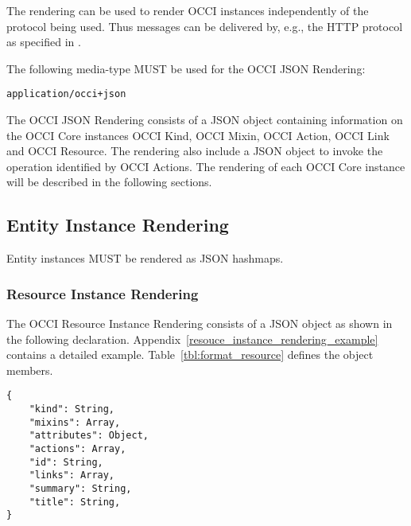 \documentclass[10pt,a4paper]{article}
\begin{document}
The rendering can be used to render OCCI instances independently of the
protocol being used. Thus messages can be delivered by, e.g., the HTTP
protocol as specified in \cite{occi:protocol}.

The following media-type MUST be used for the OCCI JSON Rendering:

{\tt application/occi+json}

The OCCI JSON Rendering consists of a JSON object containing information on the
OCCI Core instances OCCI Kind, OCCI Mixin, OCCI Action,
OCCI Link and OCCI Resource. The rendering also include a JSON object to invoke
the operation identified by OCCI Actions.
The rendering of each OCCI Core instance will be
described in the following sections.

\subsection{Entity Instance Rendering}
\label{sec:format_entity_instance_rendering}

Entity instances MUST be rendered as JSON hashmaps.

\subsubsection{Resource Instance Rendering}
\label{sec:format_resource}

The OCCI Resource Instance Rendering consists of a JSON object as shown in the
following declaration. Appendix~\ref{resouce_instance_rendering_example} contains a detailed
example.
Table~\ref{tbl:format_resource} defines the object members.
\begin{lstlisting}
{
    "kind": String,
    "mixins": Array,
    "attributes": Object,
    "actions": Array,
    "id": String,
    "links": Array,
    "summary": String,
    "title": String,
}
\end{lstlisting}
\end{document}

